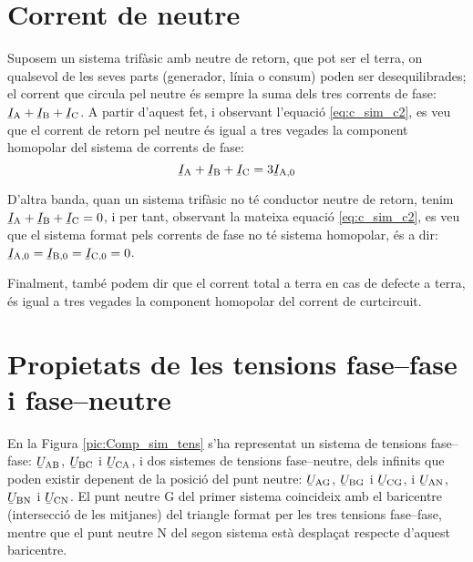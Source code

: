 \section{Corrent de neutre} 

Suposem un sistema trifàsic amb neutre de retorn, que pot ser el
terra, on qualsevol de les seves parts (generador, línia o consum)
poden ser desequilibrades; el corrent que circula pel neutre és
sempre la suma dels tres corrents de fase: $\cmplx{I}\ped{A}+
\cmplx{I}\ped{B}+\cmplx{I}\ped{C}$. A partir d'aquest fet, i
observant l'equació \eqref{eq:c_sim_c2}, es veu que el corrent de
retorn pel neutre és igual a tres vegades la component homopolar
del sistema de corrents de fase:
\begin{equation}
    \cmplx{I}\ped{A}+\cmplx{I}\ped{B}+\cmplx{I}\ped{C} =3 \cmplx{I}\ped{A,0}
\end{equation}

D'altra banda, quan un sistema trifàsic no té conductor neutre de retorn, tenim
$\cmplx{I}\ped{A}+ \cmplx{I}\ped{B}+\cmplx{I}\ped{C}=0$, i per tant,
observant la mateixa equació \eqref{eq:c_sim_c2}, es veu que el
sistema format pels corrents de fase no té sistema homopolar, és a dir: $\cmplx{I}\ped{A,0}=\cmplx{I}\ped{B,0}=\cmplx{I}\ped{C,0}=0$.

Finalment, també podem dir que el corrent total a terra en cas de
defecte a terra, és igual a tres vegades la component homopolar del
corrent de curtcircuit.

\section{Propietats de les tensions fase--fase i fase--neutre}\label{sec:comp-sim-neutre}
 

En la Figura \vref{pic:Comp_sim_tens} s'ha representat un sistema de
tensions fase--fase: $\cmplx{U}\ped{AB}$,
$\cmplx{U}\ped{BC}$ i $\cmplx{U}\ped{CA}$, i dos
sistemes de tensions fase--neutre, dels infinits que poden existir
depenent de la posició del punt neutre: $\cmplx{U}\ped{AG}$,
$\cmplx{U}\ped{BG}$ i $\cmplx{U}\ped{CG}$, i
$\cmplx{U}\ped{AN}$, $\cmplx{U}\ped{BN}$ i
$\cmplx{U}\ped{CN}$. El punt neutre G del primer sistema
coincideix amb el baricentre (intersecció de les mitjanes) del
triangle  format per les tres tensions fase--fase, mentre que el
punt neutre N del segon sistema està desplaçat respecte
d'aquest baricentre.

\begin{center}
    
    \label{pic:Comp_sim_tens}
\end{center}

